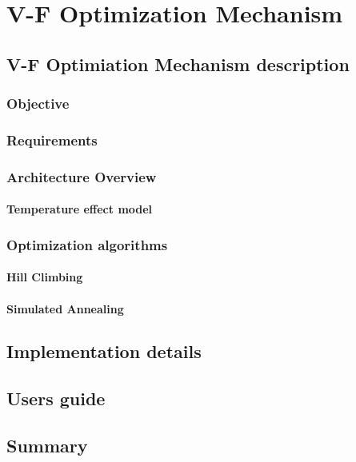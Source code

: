 
\chapter{V-F Optimization Mechanism}
\label{chapter:mech}






\section{V-F Optimiation Mechanism description}
\label{section:problem}

\subsection{Objective}
\subsection{Requirements}
\subsection{Architecture Overview}
\subsubsection{Temperature effect model}
\subsection{Optimization algorithms}
\subsubsection{Hill Climbing}

\subsubsection{Simulated Annealing}

\section{Implementation details}

\section{Users guide}


\section{Summary}